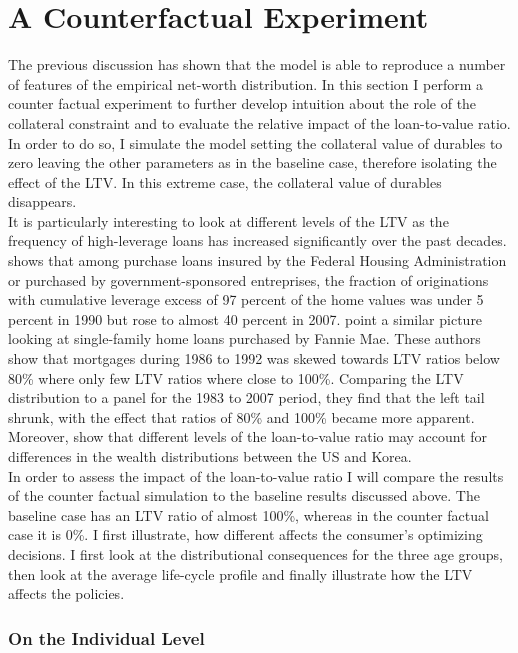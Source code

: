\documentclass[a4paper,12pt,legno]{article}
\begin{document}
\section{A Counterfactual Experiment}
The previous discussion has shown that the model is able to reproduce a number of features of the empirical net-worth distribution. In this section I perform a counter factual experiment to further develop intuition about the role of the collateral constraint and to evaluate the relative impact of the loan-to-value ratio. In order to do so, I simulate the model setting the collateral value of durables to zero leaving the other parameters as in the baseline case, therefore isolating the effect of the LTV. In this extreme case, the collateral value of durables disappears.\\
It is particularly interesting to look at different levels of the LTV as the frequency of high-leverage loans has increased significantly over the past decades. \cite{pinto2010government} shows that among purchase loans insured by the Federal Housing Administration or purchased by government-sponsored entreprises, the fraction of originations with cumulative leverage excess of 97 percent of the home values was under 5 percent in 1990 but rose to almost 40 percent in 2007. \cite{bokhari2013did} point a similar picture looking at single-family home loans purchased by Fannie Mae. These authors show that mortgages during 1986 to 1992 was skewed towards LTV ratios below 80\% where only few LTV ratios where close to 100\%. Comparing the LTV distribution to a panel for the 1983 to 2007 period, they find that the left tail shrunk, with the effect that ratios of 80\% and 100\% became more apparent. Moreover, \cite{cho2012accounting} show that different levels of the loan-to-value ratio  may account for differences in the wealth distributions between the US and Korea.\\
In order to assess the impact of the loan-to-value ratio I will compare the results of the counter factual simulation to the baseline results discussed above. The baseline case has an LTV ratio of almost 100\%, whereas in the counter factual case it is 0\%. I first illustrate, how different affects the consumer's optimizing decisions.  I first look at the distributional consequences for the three age groups, then look at the average life-cycle profile and finally illustrate how the LTV affects the policies. 

\subsubsection{On the Individual Level}
\end{document}
